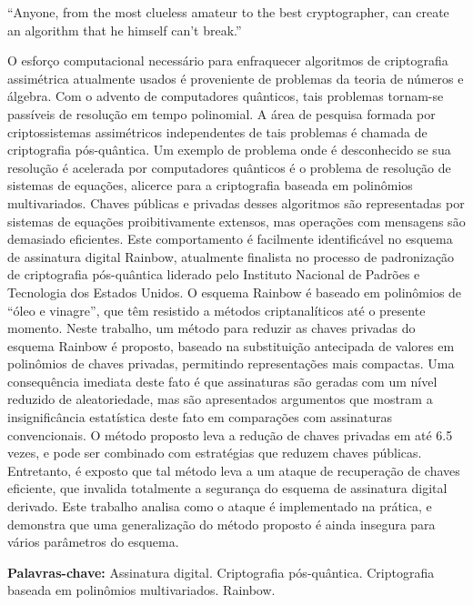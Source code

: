 \documentclass[english]{ufsc-thesis-rn46-2019/ufsc-thesis-rn46-2019}
\theoremstyle{definition}
\begin{document}
\begin{epigrafe}
  ``Anyone, from the most clueless amateur to the best cryptographer, can
  create an algorithm that he himself can’t break.''~\cite{Schneier:199810}
\end{epigrafe}

\begin{resumo}[Resumo]
  O esforço computacional necessário para
  enfraquecer algoritmos de criptografia assimétrica atualmente usados é
  proveniente de problemas da teoria de números e álgebra. Com o advento de
  computadores quânticos, tais problemas tornam-se passíveis de resolução em
  tempo polinomial. A área de pesquisa formada por criptossistemas assimétricos
  independentes de tais problemas é chamada de criptografia pós-quântica. Um
  exemplo de problema onde é desconhecido se sua resolução é acelerada por
  computadores quânticos é o problema de resolução de sistemas de equações,
  alicerce para a criptografia baseada em polinômios multivariados. Chaves
  públicas e privadas desses algoritmos são representadas por sistemas de
  equações proibitivamente extensos, mas operações com mensagens são demasiado
  eficientes. Este comportamento é facilmente identificável no esquema de
  assinatura digital Rainbow, atualmente finalista no processo de padronização
  de criptografia pós-quântica liderado pelo Instituto Nacional de Padrões e
  Tecnologia dos Estados Unidos. O esquema Rainbow é baseado em polinômios de
  ``óleo e vinagre'', que têm resistido a métodos criptanalíticos até o
  presente momento. Neste trabalho, um método para reduzir as chaves privadas
  do esquema Rainbow é proposto, baseado na substituição antecipada de valores
  em polinômios de chaves privadas, permitindo representações mais compactas.
  Uma consequência imediata deste fato é que assinaturas são geradas com um
  nível reduzido de aleatoriedade, mas são apresentados argumentos que mostram
  a insignificância estatística deste fato em comparações com assinaturas
  convencionais. O método proposto leva a redução de chaves privadas em até 6.5
  vezes, e pode ser combinado com estratégias que reduzem chaves públicas.
  Entretanto, é exposto que tal método leva a um ataque de recuperação de
  chaves eficiente, que invalida totalmente a segurança do esquema de
  assinatura digital derivado. Este trabalho analisa como o ataque é
  implementado na prática, e demonstra que uma generalização do método proposto
  é ainda insegura para vários parâmetros do esquema.

  \vspace{\baselineskip}
  \textbf{Palavras-chave:} Assinatura digital. Criptografia pós-quântica.
  Criptografia baseada em polinômios multivariados. Rainbow.
\end{resumo}
\end{document}

